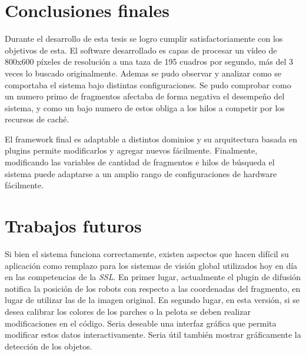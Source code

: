 
\section{Conclusiones finales}

Durante el desarrollo de esta tesis se logro cumplir satisfactoriamente con los
objetivos de esta. El software desarrollado es capas de procesar un vídeo de
800x600 píxeles de resolución a una taza de 195 cuadros por segundo, más del 3
veces lo buscado originalmente. Ademas se pudo observar y analizar como se
comportaba el sistema bajo distintas configuraciones. Se pudo comprobar como un
numero primo de fragmentos afectaba de forma negativa el desempeño del sistema,
y como un bajo numero de estos obliga a los hilos a competir por los recursos de
caché.

El framework final es adaptable a distintos dominios y su arquitectura basada en
plugins permite modificarlos y agregar nuevos fácilmente. Finalmente,
modificando las variables de cantidad de fragmentos e hilos de búsqueda el
sistema puede adaptarse a un amplio rango de configuraciones de hardware
fácilmente.

\section{Trabajos futuros}

Si bien el sistema funciona correctamente, existen aspectos que hacen difícil su
aplicación como remplazo para los sistemas de visión global utilizados hoy en
día en las competencias de la \emph{SSL}. En primer lugar, actualmente el plugin
de difusión notifica la posición de los robots con respecto a las coordenadas
del fragmento, en lugar de utilizar las de la imagen original. En segundo lugar,
en esta versión, si se desea calibrar los colores de los parches o la pelota se
deben realizar modificaciones en el código. Seria deseable una interfaz gráfica
que permita modificar estos datos interactivamente. Seria útil también mostrar
gráficamente la detección de los objetos.

